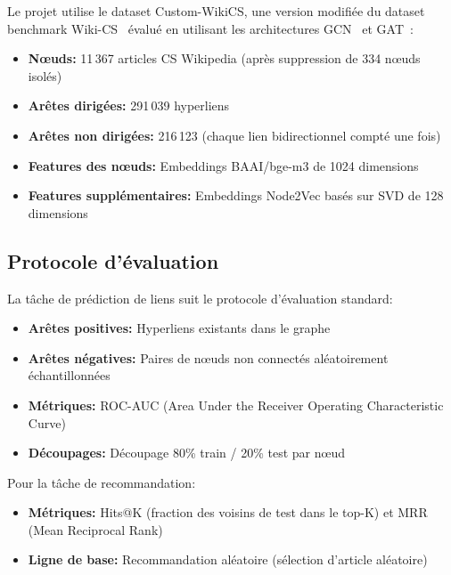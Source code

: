 Le projet utilise le dataset Custom-WikiCS, une version modifiée du dataset benchmark Wiki-CS~\cite{mernyei2020wikics} évalué en utilisant les architectures GCN~\cite{kipf2017semi} et GAT~\cite{velickovic2018graph}:

\begin{itemize}
    \item \textbf{Nœuds:} 11\,367 articles CS Wikipedia (après suppression de 334 nœuds isolés)
    \item \textbf{Arêtes dirigées:} 291\,039 hyperliens
    \item \textbf{Arêtes non dirigées:} 216\,123 (chaque lien bidirectionnel compté une fois)
    \item \textbf{Features des nœuds:} Embeddings BAAI/bge-m3 de 1024 dimensions
    \item \textbf{Features supplémentaires:} Embeddings Node2Vec basés sur SVD de 128 dimensions
\end{itemize}

\subsection{Protocole d'évaluation}

La tâche de prédiction de liens suit le protocole d'évaluation standard:

\begin{itemize}
    \item \textbf{Arêtes positives:} Hyperliens existants dans le graphe
    \item \textbf{Arêtes négatives:} Paires de nœuds non connectés aléatoirement échantillonnées
    \item \textbf{Métriques:} ROC-AUC (Area Under the Receiver Operating Characteristic Curve)
    \item \textbf{Découpages:} Découpage 80\% train / 20\% test par nœud
\end{itemize}

Pour la tâche de recommandation:

\begin{itemize}
    \item \textbf{Métriques:} Hits@K (fraction des voisins de test dans le top-K) et MRR (Mean Reciprocal Rank)
    \item \textbf{Ligne de base:} Recommandation aléatoire (sélection d'article aléatoire)
\end{itemize}
